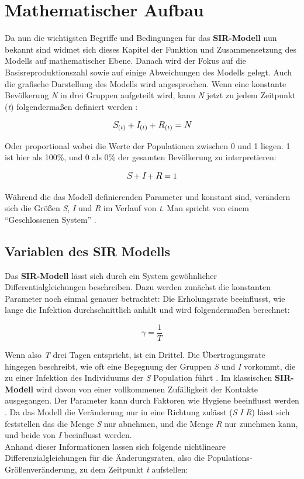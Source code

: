 \documentclass[12pt]{scrartcl} %
\begin{document}
\section{Mathematischer Aufbau}

Da nun die wichtigsten Begriffe und Bedingungen für das \textbf{SIR-Modell} nun bekannt sind widmet sich dieses Kapitel der Funktion und Zusammensetzung des Modells auf mathematischer Ebene. Danach wird der Fokus auf die Basisreproduktionszahl sowie auf einige Abweichungen des Modells gelegt. Auch die grafische Darstellung des Modells wird angesprochen.
Wenn eine konstante Bevölkerung \textit{N} in drei Gruppen aufgeteilt wird, kann \textit{N} jetzt zu jedem Zeitpunkt (\textit{t}) folgendermaßen definiert werden \cite{3,4}:

$$ \large\textit{S}_{(t)} + \textit{I}_{(t)} + \textit{R}_{(t)} = \textit{N}\normalsize $$

Oder proportional wobei die Werte der Populationen zwischen 0 und 1 liegen. 1 ist hier als 100\%, und 0 als 0\% der gesamten Bevölkerung zu interpretieren:

$$ \large\textit{S} + \textit{I} + \textit{R} = 1 $$

Während die das Modell definierenden Parameter \textbeta\space und \textgamma\space konstant sind, verändern sich die Größen \textit{S}, \textit{I} und \textit{R} im Verlauf von \textit{t}. Man spricht von einem "`Geschlossenen System"' \cite{4}.


\subsection{Variablen des SIR Modells}

Das \textbf{SIR-Modell} lässt sich durch ein System gewöhnlicher Differentialgleichungen beschreiben.
Dazu werden zunächst die konstanten Parameter noch einmal genauer betrachtet: Die Erholungsrate \textgamma\space beeinflusst, wie lange die Infektion durchschnittlich anhält und wird folgendermaßen berechnet:

$$ \gamma = \frac{1}{T} $$

Wenn also \textit{T} drei Tagen entspricht, ist \textgamma\space ein Drittel. Die Übertragungsrate \textbeta\space hingegen beschreibt, wie oft eine Begegnung der Gruppen \textit{S} und \textit{I} vorkommt, die zu einer Infektion des Individuums der \textit{S} Population führt \cite{2}. 
Im klassischen \textbf{SIR-Modell} wird davon von einer vollkommenen Zufälligkeit der Kontakte ausgegangen. Der Parameter kann durch Faktoren wie Hygiene beeinflusst werden \cite{2,7}.
Da das Modell die Veränderung nur in eine Richtung zulässt (\textit{S} \textrightarrow\space \textit{I} \textrightarrow\space \textit{R}) lässt sich feststellen das die Menge \textit{S} nur abnehmen, und die Menge \textit{R} nur zunehmen kann, und beide von \textit{I} beeinflusst werden.\\
Anhand dieser Informationen lassen sich folgende nichtlineare Differenzialgleichungen für die Änderungsraten, also die Populations-Größenveränderung, zu dem Zeitpunkt \textit{t} aufstellen:
\end{document}

